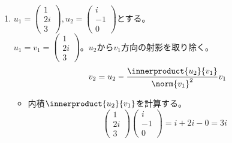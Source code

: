 \documentclass[dvipdfmx]{jsreport}
\begin{document}
\begin{souanswer}
\begin{enumerate}
	\item $u_1= \begin{pmatrix}1\\ 2i\\ 3\end{pmatrix}, u_2= \begin{pmatrix}i\\ -1\\ 0\end{pmatrix}$とする。\\
	$u_1= v_1= \begin{pmatrix}1\\ 2i\\ 3\end{pmatrix}$。$u_2$から$v_1$方向の射影を取り除く。
\begin{equation*}
	v_2= u_2- \frac{\innerproduct{u_2}{v_1}}{\norm{v_1}^2}v_1
\end{equation*}
\begin{itemize}
	\item 内積$\innerproduct{u_2}{v_1}$を計算する。
\begin{equation*}
	\begin{pmatrix}1\\ 2i\\ 3\end{pmatrix}\begin{pmatrix}i\\ -1\\ 0\end{pmatrix}= i+ 2i- 0= 3i
\end{equation*}


\end{itemize}
\end{enumerate}
\end{souanswer}
\end{document}
